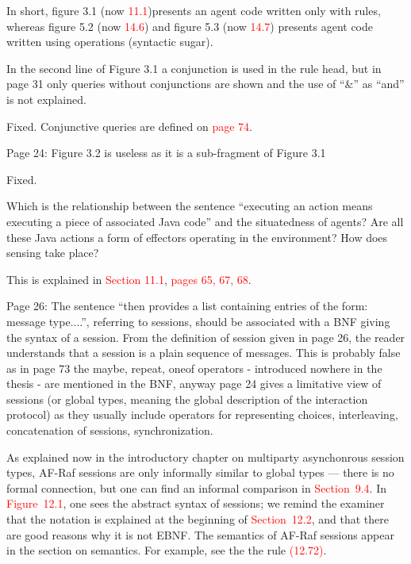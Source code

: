 \documentclass{article}
\newcommand*\R[1]{\textcolor{red}{#1}} %
\newenvironment{them}{\noindent\begingroup\color{blue}}{\endgroup\par}
\begin{document}
In short, figure 3.1 (now \R{11.1})presents an agent code written only with
rules, whereas figure 5.2 (now \R{14.6}) and figure 5.3 (now \R{14.7}) presents
agent code written using operations (syntactic sugar).

\begin{them}

In the second line of Figure 3.1 a conjunction is used in the rule head, but in
page 31 only queries without conjunctions are shown and the use of “\&” as
“and” is not explained.

\end{them}
Fixed. Conjunctive queries are defined on \R{page 74}. 

\begin{them}

Page 24:
Figure 3.2 is useless as it is a sub-fragment of Figure 3.1
\end{them}
Fixed. 

\begin{them}

Which is the relationship between the sentence “executing an action means
executing a piece of associated Java code” and the situatedness of agents? Are
all these Java actions a form of effectors operating in the environment? How
does sensing take place?

\end{them}
This is explained in \R{Section 11.1}, \R{pages 65, 67, 68}.

\begin{them}

Page 26:
The sentence “then provides a list containing entries of the form: message
type....”, referring to sessions, should be associated with a BNF giving the
syntax of a session. From the definition of session given in page 26, the
reader understands that a session is a plain sequence of messages. This is
probably false as in page 73 the maybe, repeat, oneof operators - introduced
nowhere in the thesis - are mentioned in the BNF, anyway page 24 gives a
limitative view of sessions (or global types, meaning the global description of
the interaction protocol) as they usually include operators for representing
choices, interleaving, concatenation of sessions, synchronization. 

\end{them}

As explained now in the introductory chapter on multiparty asynchonrous session
types, AF-Raf sessions are only informally similar to global types --- there is
no formal connection, but one can find an informal comparison in
\R{Section~9.4}. In \R{Figure~12.1}, one sees the abstract syntax of sessions;
we remind the examiner that the notation is explained at the beginning of
\R{Section~12.2}, and that there are good reasons why it is not EBNF.  The
semantics of AF-Raf sessions appear in the section on semantics.  For example,
see the the rule \R{(12.72)}.
\end{document}
